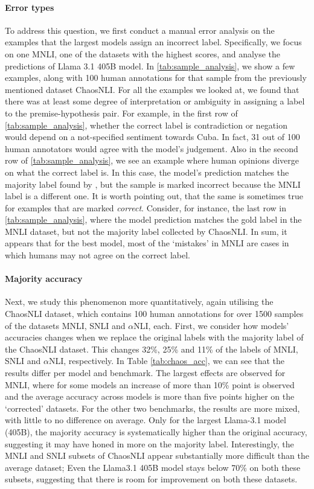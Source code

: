 \paragraph{Error types} To address this question, we first conduct a manual error analysis on the examples that the largest models assign an incorrect label.
Specifically, we focus on one MNLI, one of the datasets with the highest scores, and analyse the predictions of Llama 3.1 405B model.
In \cref{tab:sample_analysis}, we show a few examples, along with 100 human annotations for that sample from the previously mentioned dataset ChaosNLI.
For all the examples we looked at, we found that there was at least some degree of interpretation or ambiguity in assigning a label to the premise-hypothesis pair.
For example, in the first row of \cref{tab:sample_analysis}, whether the correct label is contradiction or negation would depend on a not-specified sentiment towards Cuba.
In fact, 31 out of 100 human annotators would agree with the model's judgement.
Also in the second row of \cref{tab:sample_analysis}, we see an example where human opinions diverge on what the correct label is.
In this case, the model's prediction matches the majority label found by \citet{nie-etal-2020-learn}, but the sample is marked incorrect because the MNLI label is a different one.
It is worth pointing out, that the same is sometimes true for examples that are marked \emph{correct}.
Consider, for instance, the last row in \cref{tab:sample_analysis}, where the model prediction matches the gold label in the MNLI dataset, but not the majority label collected by ChaosNLI.
In sum, it appears that for the best model, most of the `mistakes' in MNLI are cases in which humans may not agree on the correct label.

\paragraph{Majority accuracy} 
Next, we study this phenomenon more quantitatively, again utilising the ChaosNLI dataset, which contains 100 human annotations for over 1500 samples of the datasets MNLI, SNLI and $\alpha$NLI, each.
First, we consider how models' accuracies changes when we replace the original labels with the majority label of the ChaosNLI dataset.
This changes 32\%, 25\% and 11\% of the labels of MNLI, SNLI and $\alpha$NLI, respectively.
In Table \ref{tab:chaos_acc}, we can see that the results differ per model and benchmark.
The largest effects are observed for MNLI, where for some models an increase of more than 10\% point is observed and the average accuracy across models is more than five points higher on the `corrected' datasets.
For the other two benchmarks, the results are more mixed, with little to no difference on average.
Only for the largest Llama-3.1 model (405B), the majority accuracy is systematically higher than the original accuracy, suggesting it may have honed in more on the majority label.
Interestingly, the MNLI and SNLI subsets of ChaosNLI appear substantially more difficult than the average dataset;
Even the Llama3.1 405B model stays below 70\% on both these subsets, suggesting that there is room for improvement on both these datasets.

